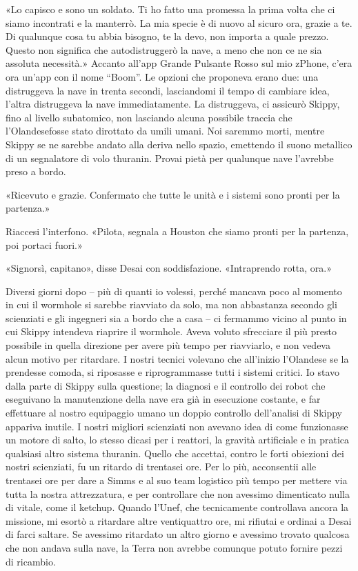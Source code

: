 «Lo capisco e sono un soldato. Ti ho fatto una promessa la prima volta
che ci siamo incontrati e la manterrò. La mia specie è di nuovo al
sicuro ora, grazie a te. Di qualunque cosa tu abbia bisogno, te la devo,
non importa a quale prezzo. Questo non significa che autodistruggerò la
nave, a meno che non ce ne sia assoluta necessità.» Accanto all'app
Grande Pulsante Rosso sul mio zPhone, c'era ora un'app con il nome
``Boom''. Le opzioni che proponeva erano due: una distruggeva la nave in
trenta secondi, lasciandomi il tempo di cambiare idea, l'altra
distruggeva la nave immediatamente. La distruggeva, ci assicurò Skippy,
fino al livello subatomico, non lasciando alcuna possibile traccia che
l'Olandesefosse stato dirottato da umili umani. Noi saremmo morti,
mentre Skippy se ne sarebbe andato alla deriva nello spazio, emettendo
il suono metallico di un segnalatore di volo thuranin. Provai pietà per
qualunque nave l'avrebbe preso a bordo.

«Ricevuto e grazie. Confermato che tutte le unità e i sistemi sono
pronti per la partenza.»

Riaccesi l'interfono. «Pilota, segnala a Houston che siamo pronti per la
partenza, poi portaci fuori.»

«Signorsì, capitano», disse Desai con soddisfazione. «Intraprendo rotta,
ora.»

\hfill\break

Diversi giorni dopo -- più di quanti io volessi, perché mancava poco al
momento in cui il wormhole si sarebbe riavviato da solo, ma non
abbastanza secondo gli scienziati e gli ingegneri sia a bordo che a casa
-- ci fermammo vicino al punto in cui Skippy intendeva riaprire il
wormhole. Aveva voluto sfrecciare il più presto possibile in quella
direzione per avere più tempo per riavviarlo, e non vedeva alcun motivo
per ritardare. I nostri tecnici volevano che all'inizio l'Olandese se la
prendesse comoda, si riposasse e riprogrammasse tutti i sistemi critici.
Io stavo dalla parte di Skippy sulla questione; la diagnosi e il
controllo dei robot che eseguivano la manutenzione della nave era già in
esecuzione costante, e far effettuare al nostro equipaggio umano un
doppio controllo dell'analisi di Skippy appariva inutile. I nostri
migliori scienziati non avevano idea di come funzionasse un motore di
salto, lo stesso dicasi per i reattori, la gravità artificiale e in
pratica qualsiasi altro sistema thuranin. Quello che accettai, contro le
forti obiezioni dei nostri scienziati, fu un ritardo di trentasei ore.
Per lo più, acconsentii alle trentasei ore per dare a Simms e al suo
team logistico più tempo per mettere via tutta la nostra attrezzatura, e
per controllare che non avessimo dimenticato nulla di vitale, come il
ketchup. Quando l'Unef, che tecnicamente controllava ancora la missione,
mi esortò a ritardare altre ventiquattro ore, mi rifiutai e ordinai a
Desai di farci saltare. Se avessimo ritardato un altro giorno e avessimo
trovato qualcosa che non andava sulla nave, la Terra non avrebbe
comunque potuto fornire pezzi di ricambio.

